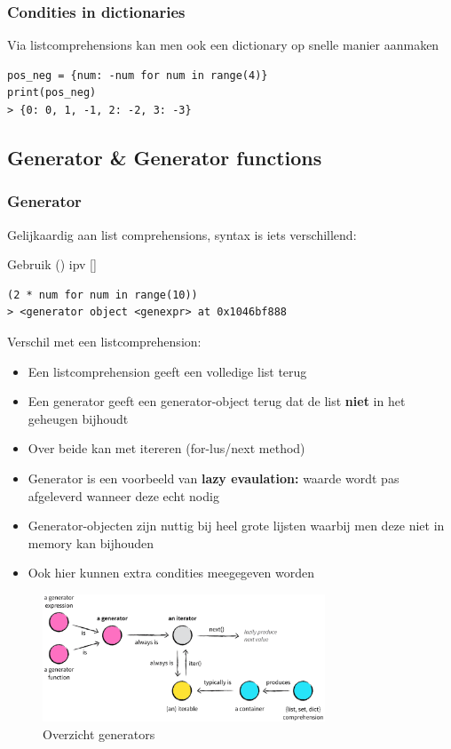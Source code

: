 \documentclass{article}
\begin{document}
\subsubsection{Condities in dictionaries}

Via listcomprehensions kan men ook een dictionary op snelle manier aanmaken

\begin{verbatim}
pos_neg = {num: -num for num in range(4)}
print(pos_neg)
> {0: 0, 1, -1, 2: -2, 3: -3}
\end{verbatim}

\subsection{Generator \& Generator functions}

\subsubsection{Generator}

Gelijkaardig aan list comprehensions, syntax is iets verschillend:

Gebruik () ipv []

\begin{verbatim}
(2 * num for num in range(10))
> <generator object <genexpr> at 0x1046bf888
\end{verbatim}

Verschil met een listcomprehension:

\begin{itemize}
    \item Een listcomprehension geeft een volledige list terug
    \item Een generator geeft een generator-object terug dat de list \textbf{niet} in het geheugen bijhoudt
    \item Over beide kan met itereren (for-lus/next method)
    \item Generator is een voorbeeld van \textbf{lazy evaulation:} waarde wordt pas afgeleverd wanneer deze echt nodig
    \item Generator-objecten zijn nuttig bij heel grote lijsten waarbij men deze niet in memory kan bijhouden
    \item Ook hier kunnen extra condities meegegeven worden
\end{itemize}


\begin{figure}[H]
    \centering
    \includegraphics[width=0.75\textwidth]{generator-object.png}
    \caption{Overzicht generators}
\end{figure}
\end{document}
